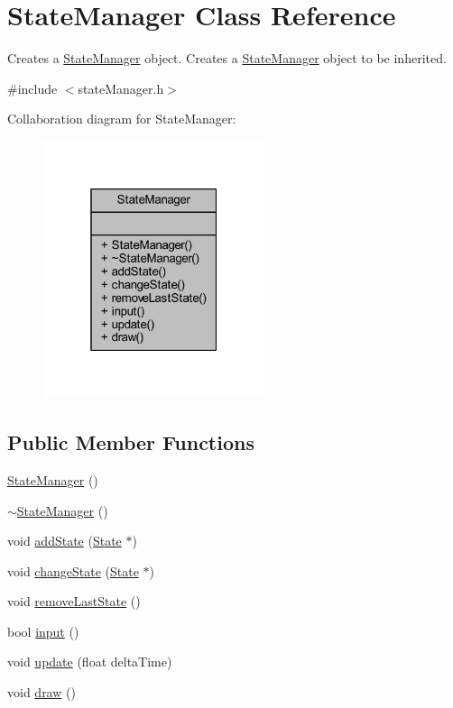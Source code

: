 \hypertarget{class_state_manager}{\section{State\+Manager Class Reference}
\label{class_state_manager}
}


Creates a \hyperlink{class_state_manager}{State\+Manager} object. Creates a \hyperlink{class_state_manager}{State\+Manager} object to be inherited.  




{\ttfamily \#include $<$state\+Manager.\+h$>$}



Collaboration diagram for State\+Manager\+:
\nopagebreak
\begin{figure}[H]
\begin{center}
\leavevmode
\includegraphics[width=184pt]{class_state_manager__coll__graph}
\end{center}
\end{figure}
\subsection*{Public Member Functions}
\begin{DoxyCompactItemize}
\item 
\hyperlink{class_state_manager_a3e2be96d935eb56813b096a885d58587}{State\+Manager} ()
\item 
\hyperlink{class_state_manager_a05a43504a033f1befad5c5118249ec6f}{$\sim$\+State\+Manager} ()
\item 
void \hyperlink{class_state_manager_a6bc633ce02f7884f082fb4ca1a53639b}{add\+State} (\hyperlink{class_state}{State} $\ast$)
\item 
void \hyperlink{class_state_manager_abad20819be992649c733f45b2a7164e2}{change\+State} (\hyperlink{class_state}{State} $\ast$)
\item 
void \hyperlink{class_state_manager_a9b20b650cab8e9068387ac12b7e60f28}{remove\+Last\+State} ()
\item 
bool \hyperlink{class_state_manager_afa8f2a280c332673075bfdd254a95603}{input} ()
\item 
void \hyperlink{class_state_manager_ae02fb746e1ef597d2842aaec506030b2}{update} (float delta\+Time)
\item 
void \hyperlink{class_state_manager_a22666f2f72320ea3be46e9253b7530e2}{draw} ()
\end{DoxyCompactItemize}


